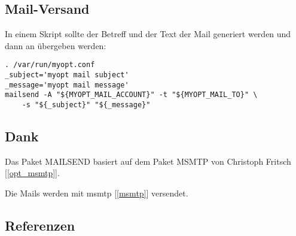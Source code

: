 \subsection{Mail-Versand}
    In einem Skript sollte der Betreff und der Text der Mail generiert werden
    und dann an  übergeben werden:
    
\begin{verbatim}
. /var/run/myopt.conf
_subject='myopt mail subject'
_message='myopt mail message'
mailsend -A "${MYOPT_MAIL_ACCOUNT}" -t "${MYOPT_MAIL_TO}" \
    -s "${_subject}" "${_message}"
\end{verbatim}

 
\subsection{Dank}

  Das Paket MAILSEND basiert auf dem Paket MSMTP 
  von Christoph Fritsch {[\ref{opt_msmtp}]}.

  Die Mails werden mit msmtp {[\ref{msmtp}]} versendet.
  
\subsection{Referenzen}

\begin{list}{\textbf{[]}}{}
  
  \item \label{opt_msmtp}
  
  \item \label{msmtp}

    \item \label{rfc5322}
\end{list}
